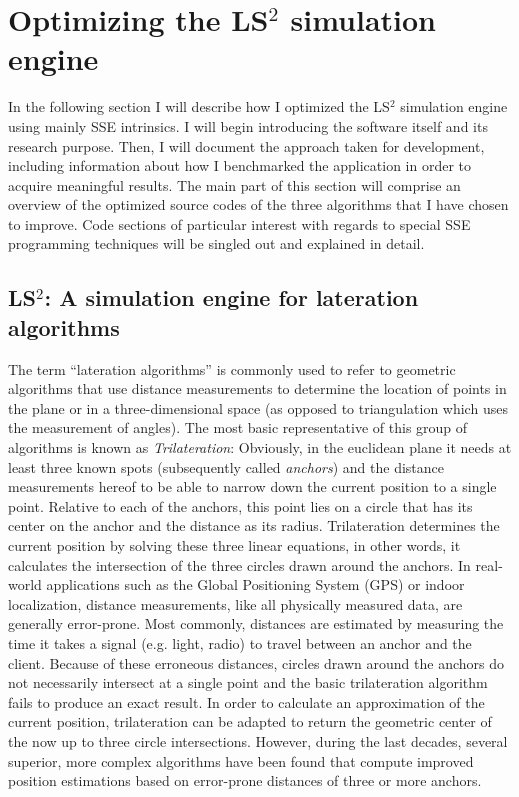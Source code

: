 \section{Optimizing the LS$^{2}$ simulation engine}
\label{Implementation}
In the following section I will describe how I optimized the LS$^{2}$ simulation engine using mainly SSE intrinsics. I will begin introducing the software itself and its research purpose. Then, I will document the approach taken for development, including information about how I benchmarked the application in order to acquire meaningful results. The main part of this section will comprise an overview of the optimized source codes of the three algorithms that I have chosen to improve. Code sections of particular interest with regards to special SSE programming techniques will be singled out and explained in detail.

\subsection{LS$^{2}$: A simulation engine for lateration algorithms}
\label{ls2}
The term ``lateration algorithms'' is commonly used to refer to geometric algorithms that use distance measurements to determine the location of points in the plane or in a three-dimensional space (as opposed to triangulation which uses the measurement of angles). The most basic representative of this group of algorithms is known as \emph{Trilateration}: Obviously, in the euclidean plane it needs at least three known spots (subsequently called \emph{anchors}) and the distance measurements hereof to be able to narrow down the current position to a single point. Relative to each of the anchors, this point lies on a circle that has its center on the anchor and the distance as its radius. Trilateration determines the current position by solving these three linear equations, in other words, it calculates the intersection of the three circles drawn around the anchors. In real-world applications such as the Global Positioning System (GPS) or indoor localization, distance measurements, like all physically measured data, are generally error-prone. Most commonly, distances are estimated by measuring the time it takes a signal (e.g. light, radio) to travel between an anchor and the client. Because of these erroneous distances, circles drawn around the anchors do not necessarily intersect at a single point and the basic trilateration algorithm fails to produce an exact result. In order to calculate an approximation of the current position, trilateration can be adapted to return the geometric center of the now up to three circle intersections. However, during the last decades, several superior, more complex algorithms have been found that compute improved position estimations based on error-prone distances of three or more anchors.

